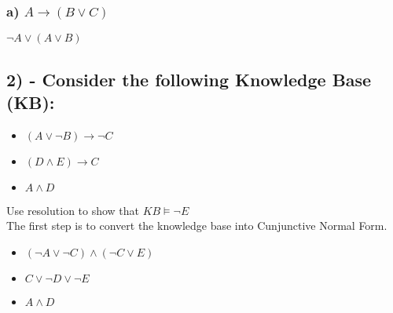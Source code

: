 \documentclass{article}
\begin{document}
	\subsubsection*{a) \(A \to (B \lor C)\)}
	\(\lnot A \lor (A \lor B)\)
\subsection*{2) - Consider the following Knowledge Base (KB):}
	\begin{itemize}
		\item \((A \lor \lnot B) \to \lnot C\)
		\item \((D \wedge E) \to C\)
		\item \(A \wedge D\)
	\end{itemize}
	Use resolution to show that \(KB \models \lnot E\)
	\\
	The first step is to convert the knowledge base into Cunjunctive Normal Form.
	\begin{itemize}
		\item \((\lnot A \lor \lnot C) \wedge (\lnot C \lor E)\)
		\item \(C \lor \lnot D \lor \lnot E\)
		\item \(A \wedge D\)
	\end{itemize}
\end{document}
